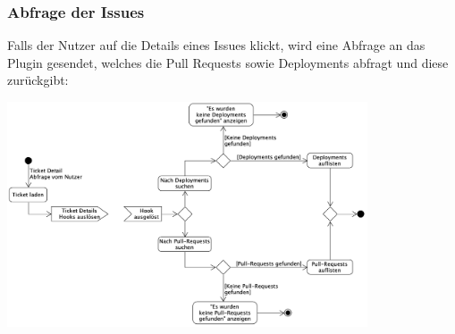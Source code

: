 \begin{minipage}{\textwidth}
  \subsubsection{Abfrage der Issues}
  Falls der Nutzer auf die Details eines Issues klickt, wird eine Abfrage an das Plugin gesendet, welches die Pull Requests sowie
  Deployments abfragt und diese zurückgibt: \newline
  \begin{center}
    \includegraphics[width=0.8\textwidth]{images/activity/issues-view.png}
    \label{fig:activity_issues}
  \end{center}
\end{minipage}

